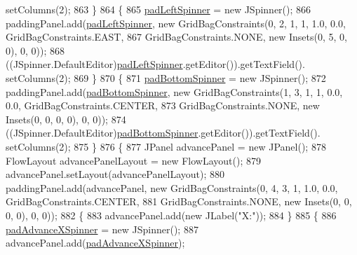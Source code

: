 \begin{DoxyCode}
      setColumns(2);
863             \}
864             \{
865                 \mbox{\hyperlink{classorg_1_1newdawn_1_1slick_1_1tools_1_1hiero_1_1_hiero_a2396ca8d40bd31d5ccafc3bfa683eb6d}{padLeftSpinner}} = \textcolor{keyword}{new} JSpinner();
866                 paddingPanel.add(\mbox{\hyperlink{classorg_1_1newdawn_1_1slick_1_1tools_1_1hiero_1_1_hiero_a2396ca8d40bd31d5ccafc3bfa683eb6d}{padLeftSpinner}}, \textcolor{keyword}{new} GridBagConstraints(0, 2, 1, 1, 1.0, 0.0,
       GridBagConstraints.EAST,
867                     GridBagConstraints.NONE, \textcolor{keyword}{new} Insets(0, 5, 0, 0), 0, 0));
868                 ((JSpinner.DefaultEditor)\mbox{\hyperlink{classorg_1_1newdawn_1_1slick_1_1tools_1_1hiero_1_1_hiero_a2396ca8d40bd31d5ccafc3bfa683eb6d}{padLeftSpinner}}.getEditor()).getTextField().
      setColumns(2);
869             \}
870             \{
871                 \mbox{\hyperlink{classorg_1_1newdawn_1_1slick_1_1tools_1_1hiero_1_1_hiero_ad1d65973a4b07eaa6b4e8f6638fa6d1b}{padBottomSpinner}} = \textcolor{keyword}{new} JSpinner();
872                 paddingPanel.add(\mbox{\hyperlink{classorg_1_1newdawn_1_1slick_1_1tools_1_1hiero_1_1_hiero_ad1d65973a4b07eaa6b4e8f6638fa6d1b}{padBottomSpinner}}, \textcolor{keyword}{new} GridBagConstraints(1, 3, 1, 1, 0.0, 
      0.0, GridBagConstraints.CENTER,
873                     GridBagConstraints.NONE, \textcolor{keyword}{new} Insets(0, 0, 0, 0), 0, 0));
874                 ((JSpinner.DefaultEditor)\mbox{\hyperlink{classorg_1_1newdawn_1_1slick_1_1tools_1_1hiero_1_1_hiero_ad1d65973a4b07eaa6b4e8f6638fa6d1b}{padBottomSpinner}}.getEditor()).getTextField().
      setColumns(2);
875             \}
876             \{
877                 JPanel advancePanel = \textcolor{keyword}{new} JPanel();
878                 FlowLayout advancePanelLayout = \textcolor{keyword}{new} FlowLayout();
879                 advancePanel.setLayout(advancePanelLayout);
880                 paddingPanel.add(advancePanel, \textcolor{keyword}{new} GridBagConstraints(0, 4, 3, 1, 1.0, 0.0, 
      GridBagConstraints.CENTER,
881                     GridBagConstraints.NONE, \textcolor{keyword}{new} Insets(0, 0, 0, 0), 0, 0));
882                 \{
883                     advancePanel.add(\textcolor{keyword}{new} JLabel(\textcolor{stringliteral}{"X:"}));
884                 \}
885                 \{
886                     \mbox{\hyperlink{classorg_1_1newdawn_1_1slick_1_1tools_1_1hiero_1_1_hiero_afd022869253bd23ee0daf1f0f06966ae}{padAdvanceXSpinner}} = \textcolor{keyword}{new} JSpinner();
887                     advancePanel.add(\mbox{\hyperlink{classorg_1_1newdawn_1_1slick_1_1tools_1_1hiero_1_1_hiero_afd022869253bd23ee0daf1f0f06966ae}{padAdvanceXSpinner}});

\end{DoxyCode}
